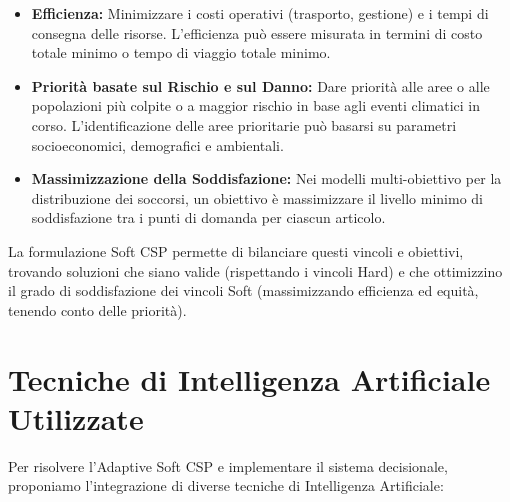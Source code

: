 \documentclass{article}
\begin{document}
\begin{itemize}
\begin{itemize}
        \item \textbf{Efficienza:} Minimizzare i costi operativi (trasporto, gestione) e i tempi di consegna delle risorse. L'efficienza può essere misurata in termini di costo totale minimo o tempo di viaggio totale minimo.
        \item \textbf{Priorità basate sul Rischio e sul Danno:} Dare priorità alle aree o alle popolazioni più colpite o a maggior rischio in base agli eventi climatici in corso. L'identificazione delle aree prioritarie può basarsi su parametri socioeconomici, demografici e ambientali.
        \item \textbf{Massimizzazione della Soddisfazione:} Nei modelli multi-obiettivo per la distribuzione dei soccorsi, un obiettivo è massimizzare il livello minimo di soddisfazione tra i punti di domanda per ciascun articolo.
    \end{itemize}
\end{itemize}

La formulazione Soft CSP permette di bilanciare questi vincoli e obiettivi, trovando soluzioni che siano valide (rispettando i vincoli Hard) e che ottimizzino il grado di soddisfazione dei vincoli Soft (massimizzando efficienza ed equità, tenendo conto delle priorità).

\section{Tecniche di Intelligenza Artificiale Utilizzate}
Per risolvere l'Adaptive Soft CSP e implementare il sistema decisionale, proponiamo l'integrazione di diverse tecniche di Intelligenza Artificiale:
\end{document}
